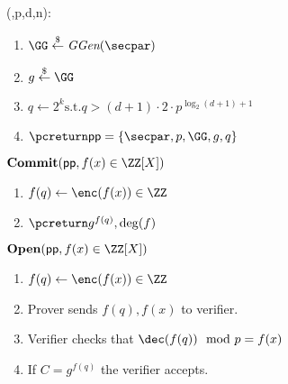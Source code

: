 \documentclass{article}
\begin{document}
\begin{mdframed}[userdefinedwidth=0.8\textwidth]
\begin{minipage}{\textwidth}
	\begin{flushleft}
	\setup(\secpar,p,d,n):
		\begin{enumerate}[nolistsep]
			\item $ \GG \sample \ggen(\secpar)$
			\item $ g \sample \GG$
			\item $q\gets 2^k \text{s.t.} q>(d+1) \cdot 2\cdot p^{\log_2(d+1)+1} $
			\item $\pcreturn \crs=\{\secpar,p,\GG,g,q\}$
		\end{enumerate}
		$\commit(\crs,f(x)\in \ZZ[X])$ 
		\begin{enumerate}[nolistsep]
			\item 	$f(q)\gets \enc(f(x)) \in \ZZ$
			\item $\pcreturn g^{f(q)},\deg(f)$
		\end{enumerate}
		$\open(\crs,f(x)\in \ZZ[X])$
		\begin{enumerate}[nolistsep]
			\item $f(q)\gets \enc(f(x)) \in \ZZ$
			\item Prover sends $f(q),f(x)$ to verifier.
			\item Verifier checks that $\dec(f(q)) \mod p=f(x)$
			\item If $C=g^{f(q)}$ the verifier accepts.
		\end{enumerate}
	\end{flushleft}
	
\end{minipage}
\end{mdframed}
\end{document}

